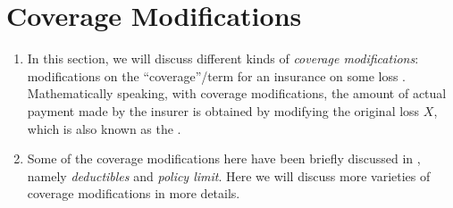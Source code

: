 \section{Coverage Modifications}
\label{sect:coverage-mod}
\begin{enumerate}
\item In this section, we will discuss different kinds of \emph{coverage
modifications}: modifications on the ``coverage''/term for an insurance on some
loss . Mathematically speaking, with coverage modifications,
the amount of actual payment  made by the insurer
 is obtained by modifying the original loss \(X\), which is
also known as the .

\item Some of the coverage modifications here have been briefly discussed in
, namely \emph{deductibles} and \emph{policy limit}.
Here we will discuss more varieties of coverage modifications in more
details.
\end{enumerate}
